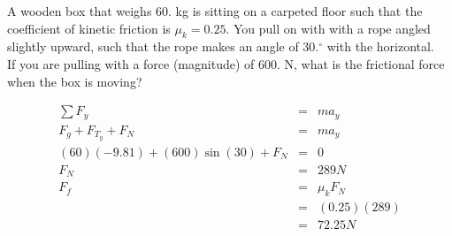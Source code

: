 \question[5] A wooden box that weighs 60. kg is sitting on a carpeted floor such that the
coefficient of kinetic friction is $\mu_k = 0.25$. You pull on with with a rope angled
slightly upward, such that the rope makes an angle of 30.$^\circ$ with the horizontal.\\

If you are pulling with a force (magnitude) of 600. N, what is the frictional force
when the box is moving?

\begin{choices}
\end{choices}

\begin{solution}[8cm]
    \begin{eqnarray*}
        \sum F_y &=& ma_y\\
        F_g + F_{T_y} + F_N &=& ma_y\\
        (60)(-9.81) + (600)\sin(30) + F_N &=& 0 \\
        F_N &=& 289 N \\
        F_f &=& \mu_k F_N \\
            &=& (0.25) (289) \\
            &=& 72.25 N
    \end{eqnarray*}
\end{solution}

